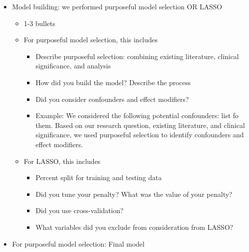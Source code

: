 \documentclass[
  letterpaper,
  DIV=11,
  numbers=noendperiod]{scrartcl}
\providecommand{\tightlist}{%
  \setlength{\itemsep}{0pt}\setlength{\parskip}{0pt}}
\begin{document}
\begin{itemize}
\begin{itemize}
\begin{itemize}
\begin{itemize}
        \begin{itemize}
        \tightlist
        \item
          We categorized age into the following groups: \_\_\_,
          \_\_\_\_, \_\_\_\_, \_\_\_\_ based on existing guidelines from
          \textless insert reference here\textgreater.
        \item
          We created a new variable for any hardship by combining the
          following variables: \_\_\_, \_\_\_, and \_\_\_. We
          categorized this variable into the following groups: \_\_\_,
          \_\_\_, and \_\_\_
        \item
          We treated number of children as numeric
        \end{itemize}
      \end{itemize}
    \item
      1 bullet for all variables
    \end{itemize}
  \item
    Model building: we performed {purposeful model selection} OR {LASSO}

    \begin{itemize}
    \tightlist
    \item
      1-3 bullets
    \item
      {For purposeful model selection}, this includes

      \begin{itemize}
      \tightlist
      \item
        Describe purposeful selection: combining existing literature,
        clinical significance, and analysis
      \item
        How did you build the model? Describe the process
      \item
        Did you consider confounders and effect modifiers?
      \item
        Example: We considered the following potential confounders: list
        fo them. Based on our research question, existing literature,
        and clinical significance, we used purposeful selection to
        identify confounders and effect modifiers.
      \end{itemize}
    \item
      {For LASSO}, this includes

      \begin{itemize}
      \tightlist
      \item
        Percent split for training and testing data
      \item
        Did you tune your penalty? What was the value of your penalty?
      \item
        Did you use cross-validation?
      \item
        What variables did you exclude from consideration from LASSO?
      \end{itemize}
    \end{itemize}
  \item
    {For purposeful model selection}: Final model


\end{itemize}
\end{itemize}
\end{document}
